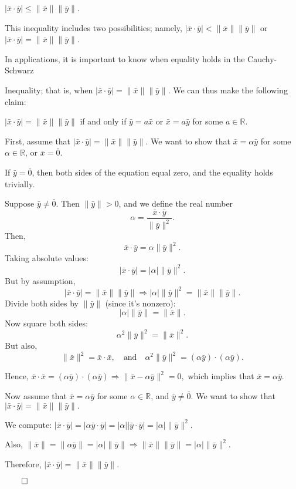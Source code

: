 $|\bar{x} \cdot \bar{y}| \leq \|\bar{x}\|\|\bar{y}\|$.

This inequality includes two possibilities; namely,
$|\bar{x} \cdot \bar{y}| < \|\bar{x}\|\|\bar{y}\|$ or $|\bar{x} \cdot \bar{y}| = \|\bar{x}\|\|\bar{y}\|$.

In applications, it is important to know when equality holds in the Cauchy-Schwarz 

Inequality; that is, when $|\bar{x} \cdot \bar{y}| = \|\bar{x}\|\|\bar{y}\|$. 
We can thus make the following claim:
\begin{propositionbox}
 $|\bar{x} \cdot \bar{y}| = \|\bar{x}\|\|\bar{y}\|$ if and only if $\bar{y} = a\bar{x}$ or $\bar{x} = a\bar{y}$ for some $a \in \mathbb{R}$.
 
\end{propositionbox}

\begin{proofbox}
First, assume that \( |\bar{x} \cdot \bar{y}| = \|\bar{x}\| \|\bar{y}\| \).  
We want to show that \( \bar{x} = \alpha \bar{y} \) for some \( \alpha \in \mathbb{R} \), or \( \bar{x} = \bar{0} \).

If \( \bar{y} = \bar{0} \), then both sides of the equation equal zero, and the equality holds trivially.

Suppose \( \bar{y} \neq \bar{0} \). Then \( \|\bar{y}\| > 0 \), and we define the real number
\[
\alpha = \frac{\bar{x} \cdot \bar{y}}{\|\bar{y}\|^2}.
\]
Then,
\[
\bar{x} \cdot \bar{y} = \alpha \|\bar{y}\|^2.
\]
Taking absolute values:
\[
|\bar{x} \cdot \bar{y}| = |\alpha| \|\bar{y}\|^2.
\]
But by assumption,
\[
|\bar{x} \cdot \bar{y}| = \|\bar{x}\| \|\bar{y}\| \Rightarrow |\alpha| \|\bar{y}\|^2 = \|\bar{x}\| \|\bar{y}\|.
\]
Divide both sides by \( \|\bar{y}\| \) (since it's nonzero):
\[
|\alpha| \|\bar{y}\| = \|\bar{x}\|.
\]
Now square both sides:
\[
\alpha^2 \|\bar{y}\|^2 = \|\bar{x}\|^2.
\]
But also,
\[
\|\bar{x}\|^2 = \bar{x} \cdot \bar{x}, \quad \text{and} \quad \alpha^2 \|\bar{y}\|^2 = (\alpha \bar{y}) \cdot (\alpha \bar{y}).
\]

Hence,
\(
\bar{x} \cdot \bar{x} = (\alpha \bar{y}) \cdot (\alpha \bar{y}) \Rightarrow \|\bar{x} - \alpha \bar{y}\|^2 = 0,
\)
which implies that \(
\bar{x} = \alpha \bar{y}.
\)
\vspace{1em}

Now assume that \( \bar{x} = \alpha \bar{y} \) for some \( \alpha \in \mathbb{R} \), and \( \bar{y} \neq \bar{0} \). We want to show that
\(
|\bar{x} \cdot \bar{y}| = \|\bar{x}\| \|\bar{y}\|.
\)

We compute:
\(
|\bar{x} \cdot \bar{y}| = |\alpha \bar{y} \cdot \bar{y}| = |\alpha| |\bar{y} \cdot \bar{y}| = |\alpha| \|\bar{y}\|^2.
\)

Also,
\(
\|\bar{x}\| = \|\alpha \bar{y}\| = |\alpha| \|\bar{y}\| \Rightarrow \|\bar{x}\| \|\bar{y}\| = |\alpha| \|\bar{y}\|^2.
\)

Therefore,
\(
|\bar{x} \cdot \bar{y}| = \|\bar{x}\| \|\bar{y}\|.
\)

\hfill $\qed$

\end{proofbox}

